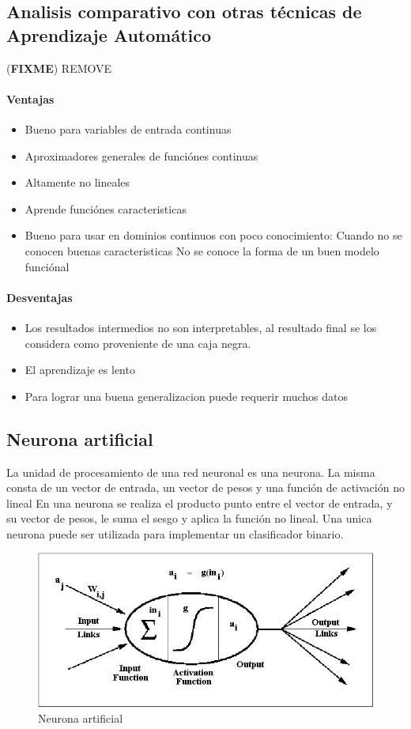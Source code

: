 \documentclass[a4paper,11pt,spanish]{book}
\newcommand*{\FIXME}[1]{{(\textbf{FIXME}) {#1}}}
\begin{document}
      \subsection{Analisis comparativo con otras técnicas de Aprendizaje Automático}\FIXME{REMOVE}
	\paragraph {Ventajas}
	  \begin{itemize}
	    \item Bueno para variables de entrada continuas
	    \item Aproximadores generales de funciónes continuas
	    \item Altamente no lineales
	    \item Aprende funciónes caracteristicas
	    \item Bueno para usar en dominios continuos con poco conocimiento:
	      \subitem Cuando no se conocen buenas caracteristicas
	      \subitem No se conoce la forma de un buen modelo funciónal
	  \end{itemize}
	\paragraph {Desventajas}
	  \begin{itemize}
	    \item Los resultados intermedios no son interpretables, al resultado final se los considera como proveniente de una caja negra.
	    \item El aprendizaje es lento
	    \item Para lograr una buena generalizacion puede requerir muchos datos
	  \end{itemize}

      \subsection {Neurona artificial}
	La unidad de procesamiento de una red neuronal es una neurona. La misma consta de un vector de entrada, un vector de pesos y una función de activación no lineal
	En una neurona se realiza el producto punto entre el vector de entrada, y su vector de pesos, le suma el sesgo y aplica la función no lineal.
	Una unica neurona puede ser utilizada para implementar un clasificador binario.
	\begin{figure}[H]
          \begin{center}
            \includegraphics[width=0.4\linewidth]{./img/neuron.jpg}
	  \caption{Neurona artificial}
          \end{center}
          \label{fig:neuron}
	\end{figure}
\end{document}
